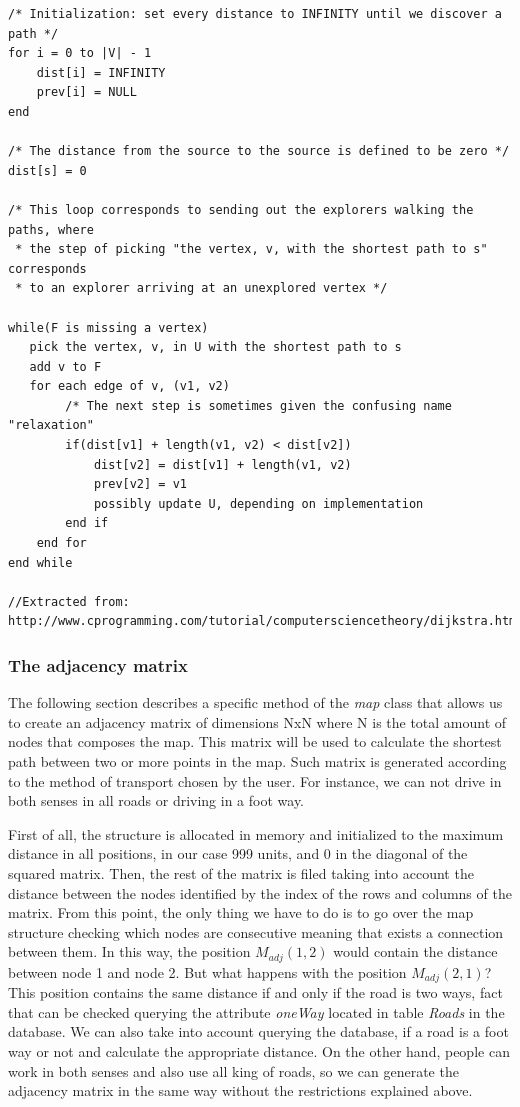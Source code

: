 \documentclass{article}
\begin{document}
\begin{lstlisting}
/* Initialization: set every distance to INFINITY until we discover a path */
for i = 0 to |V| - 1
    dist[i] = INFINITY
    prev[i] = NULL
end

/* The distance from the source to the source is defined to be zero */
dist[s] = 0

/* This loop corresponds to sending out the explorers walking the paths, where
 * the step of picking "the vertex, v, with the shortest path to s" corresponds
 * to an explorer arriving at an unexplored vertex */

while(F is missing a vertex)
   pick the vertex, v, in U with the shortest path to s
   add v to F
   for each edge of v, (v1, v2)
        /* The next step is sometimes given the confusing name "relaxation"
        if(dist[v1] + length(v1, v2) < dist[v2])
            dist[v2] = dist[v1] + length(v1, v2)
            prev[v2] = v1
            possibly update U, depending on implementation
        end if
    end for
end while

//Extracted from: http://www.cprogramming.com/tutorial/computersciencetheory/dijkstra.html
\end{lstlisting}

\subsubsection{The adjacency matrix}
The following section describes a specific method of the \textit{map} class that allows us to create an adjacency matrix of dimensions NxN where N is the total amount of nodes that composes the map. This matrix will be used to calculate the shortest path between two or more points in the map. Such matrix is generated according to the method of transport chosen by the user. For instance, we can not drive in both senses in all roads or driving in a foot way.

First of all, the structure is allocated in memory and initialized to the maximum distance in all positions, in our case 999 units, and 0 in the diagonal of the squared matrix. Then, the rest of the matrix is filed taking into account the distance between the nodes identified by the index of the rows and columns of the matrix. From this point, the only thing we have to do is to go over the map structure checking which nodes are consecutive meaning that exists a connection between them. In this way, the position $M_{adj}(1,2)$ would contain the distance between node 1 and node 2. But what happens with the position $M_{adj}(2,1)$? This position contains the same distance if and only if the road is two ways, fact that can be checked querying the attribute \textit{oneWay} located in table \textit{Roads} in the database. 
We can also take into account querying the database, if a road is a foot way or not and calculate the appropriate distance.
On the other hand, people can work in both senses and also use all king of roads, so we can generate the adjacency matrix in the same way without the restrictions explained above.
\end{document}
